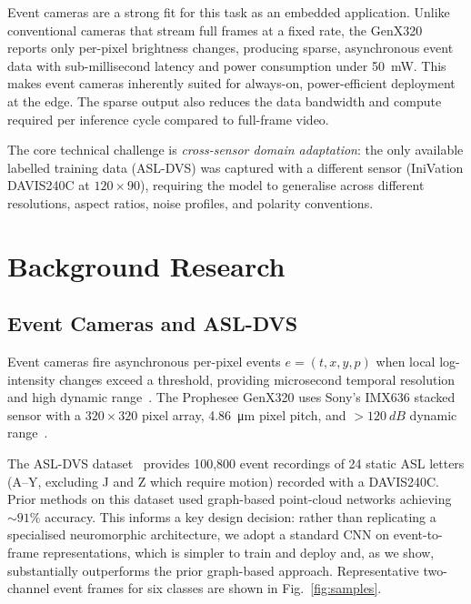 \documentclass[journal]{IEEEtran}
\begin{document}
Event cameras are a strong fit for this task as an embedded application. Unlike conventional cameras that stream full frames at a fixed rate, the GenX320 reports only per-pixel brightness changes, producing sparse, asynchronous event data with sub-millisecond latency and power consumption under \SI{50}{mW}. This makes event cameras inherently suited for always-on, power-efficient deployment at the edge. The sparse output also reduces the data bandwidth and compute required per inference cycle compared to full-frame video.

The core technical challenge is \textit{cross-sensor domain adaptation}: the only available labelled training data (ASL-DVS) was captured with a different sensor (IniVation DAVIS240C at $120{\times}90$), requiring the model to generalise across different resolutions, aspect ratios, noise profiles, and polarity conventions.

\section{Background Research}

\subsection{Event Cameras and ASL-DVS}

Event cameras fire asynchronous per-pixel events $e = (t, x, y, p)$ when local log-intensity changes exceed a threshold, providing microsecond temporal resolution and high dynamic range~\cite{lichtsteiner2008}. The Prophesee GenX320 uses Sony's IMX636 stacked sensor with a $320{\times}320$ pixel array, \SI{4.86}{\micro\metre} pixel pitch, and $>\SI{120}{dB}$ dynamic range~\cite{prophesee2023}.

The ASL-DVS dataset~\cite{bi2019} provides 100,800 event recordings of 24 static ASL letters (A--Y, excluding J and Z which require motion) recorded with a DAVIS240C. Prior methods on this dataset used graph-based point-cloud networks achieving ${\sim}91\%$ accuracy. This informs a key design decision: rather than replicating a specialised neuromorphic architecture, we adopt a standard CNN on event-to-frame representations, which is simpler to train and deploy and, as we show, substantially outperforms the prior graph-based approach. Representative two-channel event frames for six classes are shown in Fig.~\ref{fig:samples}.
\end{document}
